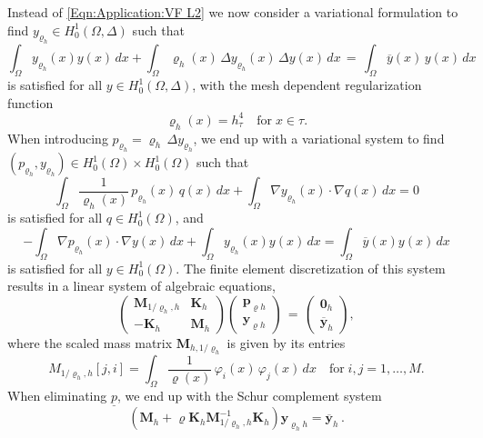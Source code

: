\documentclass{article}
\numberwithin{equation}{section}
\begin{document}
Instead of \eqref{Eqn:Application:VF L2} we now consider a
variational formulation to find $y_{\varrho_h} \in H^1_0(\Omega,\Delta)$
such that
\[
  \int_\Omega y_{\varrho_h}(x) y(x) \, dx +
  \int_\Omega \varrho_h(x) \, \Delta y_{\varrho_h}(x) \,
  \Delta y(x) \, dx \, = \, \int_\Omega \overline{y}(x) \, y(x) \, dx
\]
is satisfied for all $y \in H^1_0(\Omega,\Delta)$, with
the mesh dependent regularization function
\[
\varrho_h(x) = h_\tau^4 \quad \mbox{for} \; x \in \tau .
\]
When introducing
$p_{\varrho_h} = \varrho_h \, \Delta y_{\varrho_h}$, we end up with
a variational system to find
$(p_{\varrho_h},y_{\varrho_h}) \in H^1_0(\Omega) \times H^1_0(\Omega)$
such that
\[
  \int_\Omega \frac{1}{\varrho_h(x)} \, p_{\varrho_h}(x) \, q(x) \, dx +
  \int_\Omega \nabla y_{\varrho_h}(x) \cdot \nabla q(x) \, dx = 0
\]
is satisfied for all $q \in H^1_0(\Omega)$, and
\[
  - \int_\Omega \nabla p_{\varrho_h}(x) \cdot \nabla y(x) \, dx +
  \int_\Omega y_{\varrho_h}(x) y(x) \, dx =
  \int_\Omega \overline{y}(x) y(x) \, dx
\]
is satisfied for all $y \in H^1_0(\Omega)$. The finite element
discretization of this system results in a linear system of
algebraic equations,
\[
  \left(
    \begin{array}{cc}
      \mathbf{M}_{1/\varrho_h,h} & \mathbf{K}_h \\[1mm]
      - \mathbf{K}_h & \mathbf{M}_h
    \end{array}
  \right)
  \left(
    \begin{array}{c}
      \mathbf{p}_{\varrho h} \\[1mm]
      \mathbf{y}_{\varrho h}
    \end{array}
  \right)
  \, = \,
  \left(
    \begin{array}{c}
      \mathbf{0}_h\\[1mm]
      \overline{\mathbf{y}}_h
    \end{array} \right) ,
\]
where the scaled mass matrix $\mathbf{M}_{h,1/\varrho_h}$ is given by its
entries
\[
  M_{1/\varrho_h,h}[j,i] =
  \int_\Omega \frac{1}{\varrho(x)} \, \varphi_i(x) \, \varphi_j(x) \, dx
  \quad \mbox{for} \; i,j=1,\ldots, M.
\]
When eliminating $\underline{p}$, we end up with the
Schur complement system
\[
  ( \mathbf{M}_h + \varrho \mathbf{K}_h \mathbf{M}_{1/\varrho_h,h}^{-1} \mathbf{K}_h) %
  \mathbf{y}_{\varrho_h h} = \overline{\mathbf{y}}_h \, .
\]
%
%
\end{document}
